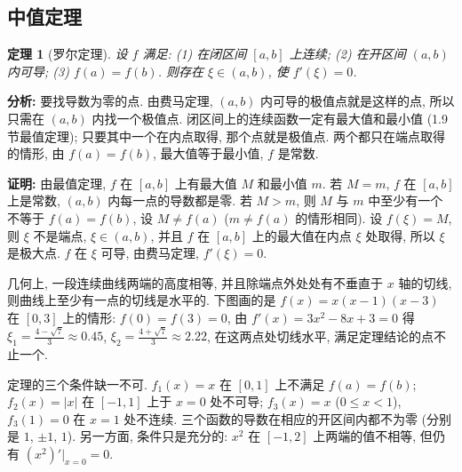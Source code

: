 \documentclass[UTF8,openany]{ctexbook}
\theoremstyle{chinesetextbook}
\newtheorem{theorem}{定理}[section]
\newenvironment{cnproof}{\par\indent\textbf{证明:} \ignorespaces}{\par}
\begin{document}
\subsection{中值定理}
\begin{theorem}[罗尔定理]\label{thm:c2-6-rolle}
设 $f$ 满足: (1) 在闭区间 $[a,b]$ 上连续; (2) 在开区间 $(a,b)$ 内可导; (3) $f(a)=f(b)$. 则存在 $\xi\in(a,b)$, 使 $f'(\xi)=0$.
\end{theorem}
\par\indent\textbf{分析:} 要找导数为零的点. 由费马定理, $(a,b)$ 内可导的极值点就是这样的点, 所以只需在 $(a,b)$ 内找一个极值点. 闭区间上的连续函数一定有最大值和最小值 (1.9 节最值定理); 只要其中一个在内点取得, 那个点就是极值点. 两个都只在端点取得的情形, 由 $f(a)=f(b)$, 最大值等于最小值, $f$ 是常数.
\begin{cnproof}
由最值定理, $f$ 在 $[a,b]$ 上有最大值 $M$ 和最小值 $m$. 若 $M=m$, $f$ 在 $[a,b]$ 上是常数, $(a,b)$ 内每一点的导数都是零. 若 $M>m$, 则 $M$ 与 $m$ 中至少有一个不等于 $f(a)=f(b)$, 设 $M\ne f(a)$ ($m\ne f(a)$ 的情形相同). 设 $f(\xi)=M$, 则 $\xi$ 不是端点, $\xi\in(a,b)$, 并且 $f$ 在 $[a,b]$ 上的最大值在内点 $\xi$ 处取得, 所以 $\xi$ 是极大点. $f$ 在 $\xi$ 可导, 由费马定理, $f'(\xi)=0$.
\end{cnproof}
几何上, 一段连续曲线两端的高度相等, 并且除端点外处处有不垂直于 $x$ 轴的切线, 则曲线上至少有一点的切线是水平的. 下图画的是 $f(x)=x(x-1)(x-3)$ 在 $[0,3]$ 上的情形: $f(0)=f(3)=0$, 由 $f'(x)=3x^2-8x+3=0$ 得 $\displaystyle\xi_1=\frac{4-\sqrt7}3\approx0.45$, $\displaystyle\xi_2=\frac{4+\sqrt7}3\approx2.22$, 在这两点处切线水平, 满足定理结论的点不止一个.
\begin{center}
\end{center}
定理的三个条件缺一不可. $f_1(x)=x$ 在 $[0,1]$ 上不满足 $f(a)=f(b)$; $f_2(x)=|x|$ 在 $[-1,1]$ 上于 $x=0$ 处不可导; $f_3(x)=x$ ($0\le x<1$), $f_3(1)=0$ 在 $x=1$ 处不连续. 三个函数的导数在相应的开区间内都不为零 (分别是 $1$, $\pm1$, $1$). 另一方面, 条件只是充分的: $x^2$ 在 $[-1,2]$ 上两端的值不相等, 但仍有 $(x^2)'\big|_{x=0}=0$.
\end{document}
